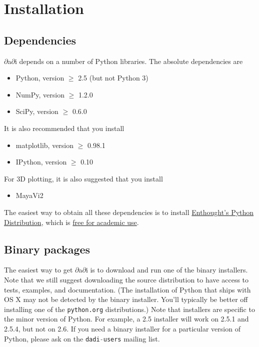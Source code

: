 \documentclass[12pt]{article}
\makeatletter
\newcommand{\dadi}{$\partial$a$\partial$i\xspace}
\newcommand{\py}[1]{\lstinline[language=Python, showstringspaces=False]@#1@}
\makeatother
\begin{document}
\section{Installation}

\subsection{Dependencies}

\dadi depends on a number of Python libraries. The absolute dependencies are
\begin{itemize}
\item Python, version $\geq$ 2.5 (but not Python 3)
\item NumPy, version $\geq$ 1.2.0
\item SciPy, version $\geq$ 0.6.0
\end{itemize}
It is also recommended that you install
\begin{itemize}
\item matplotlib, version $\geq$ 0.98.1
\item IPython, version $\geq$ 0.10
\end{itemize}
For 3D plotting, it is also suggested that you install
\begin{itemize}
\item MayaVi2
\end{itemize}

The easiest way to obtain all these dependencies is to install \href{http://www.enthought.com/products/epd.php}{Enthought's Python Distribution}, which is \href{http://www.enthought.com/products/edudownload.php}{free for academic use}.

\subsection{Binary packages}

The easiest way to get \dadi is to download and run one of the binary installers.
Note that we still suggest downloading the source distribution to have access to tests, examples, and documentation.
(The installation of Python that ships with OS X may not be detected by the binary installer.
You'll typically be better off installing one of the \py{python.org} distributions.)
Note that installers are specific to the minor version of Python. For example, a 2.5 installer will work on 2.5.1 and 2.5.4, but not on 2.6.
If you need a binary installer for a particular version of Python, please ask on the \py{dadi-users} mailing list.
\end{document}
